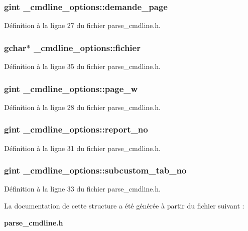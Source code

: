 \subsubsection[{demande\_\-page}]{\setlength{\rightskip}{0pt plus 5cm}gint {\bf \_\-cmdline\_\-options::demande\_\-page}}\label{struct__cmdline__options_a4328407a3f2753ee2ade2e1d86586b6a}


Définition à la ligne 27 du fichier parse\_\-cmdline.h.

\subsubsection[{fichier}]{\setlength{\rightskip}{0pt plus 5cm}gchar$\ast$ {\bf \_\-cmdline\_\-options::fichier}}\label{struct__cmdline__options_a071d435b696334ddd4ac55cb1c22a4bd}


Définition à la ligne 35 du fichier parse\_\-cmdline.h.

\subsubsection[{page\_\-w}]{\setlength{\rightskip}{0pt plus 5cm}gint {\bf \_\-cmdline\_\-options::page\_\-w}}\label{struct__cmdline__options_a98c0ca7473a483639e4ff71453f508cc}


Définition à la ligne 28 du fichier parse\_\-cmdline.h.

\subsubsection[{report\_\-no}]{\setlength{\rightskip}{0pt plus 5cm}gint {\bf \_\-cmdline\_\-options::report\_\-no}}\label{struct__cmdline__options_a17f73c4dfdcd6e8b3132a7b7b8bbc30a}


Définition à la ligne 31 du fichier parse\_\-cmdline.h.

\subsubsection[{subcustom\_\-tab\_\-no}]{\setlength{\rightskip}{0pt plus 5cm}gint {\bf \_\-cmdline\_\-options::subcustom\_\-tab\_\-no}}\label{struct__cmdline__options_ab8fc8de9dacd72114e96abb6efe0ab19}


Définition à la ligne 33 du fichier parse\_\-cmdline.h.



La documentation de cette structure a été générée à partir du fichier suivant :\begin{DoxyCompactItemize}
\item 
{\bf parse\_\-cmdline.h}\end{DoxyCompactItemize}
